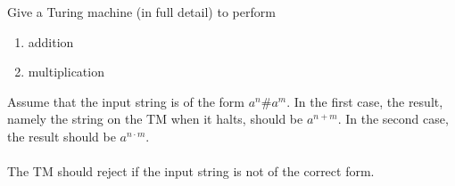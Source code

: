 \documentclass{article}
\begin{document}
\begin{exercise}
Give a Turing machine (in full detail) to perform
\begin{enumerate}
 \item addition
 \item multiplication
\end{enumerate}
Assume that the input string is of the form $a^n\#a^m$. In the first case, the result, namely the string on the TM when it halts, should be $a^{n+m}$. In the second case, the result should be $a^{n\cdot m}$.
\paragraph{}
The TM should reject if the input string is not of the correct form.
\end{exercise}
\end{document}

